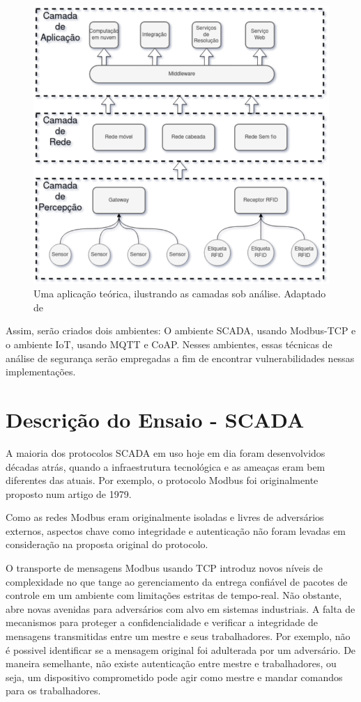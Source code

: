 \documentclass[tcc,capa]{texufpel}
\begin{document}
\begin{figure}[h]
    \centering
    \includegraphics[scale=0.6]{camadas.png}
    \caption{Uma aplicação teórica, ilustrando as camadas sob análise. Adaptado de \cite{schiller}}
    \label{fig:layers}
\end{figure}

Assim, serão criados dois ambientes: O ambiente SCADA, usando Modbus-TCP e o ambiente IoT, usando MQTT e CoAP. Nesses ambientes, essas técnicas de
análise de segurança serão empregadas a fim de encontrar vulnerabilidades nessas implementações.

\section{Descrição do Ensaio - SCADA}

A maioria dos protocolos SCADA em uso hoje em dia foram desenvolvidos décadas atrás, quando a infraestrutura tecnológica e as ameaças eram bem diferentes das atuais. Por exemplo, o
protocolo Modbus foi originalmente proposto num artigo de 1979.

Como as redes Modbus eram originalmente isoladas e livres de adversários externos, aspectos chave como integridade e autenticação não foram levadas em consideração na proposta
original do protocolo.

O transporte de mensagens Modbus usando TCP introduz novos níveis de complexidade no que tange ao gerenciamento da entrega confiável de pacotes de controle em um ambiente com
limitações estritas de tempo-real. Não obstante, abre novas avenidas para adversários com alvo em sistemas industriais.
A falta de mecanismos para proteger a confidencialidade e verificar a integridade de mensagens transmitidas entre um mestre e seus trabalhadores. Por exemplo, não é possivel
identificar se a mensagem original foi adulterada por um adversário. De maneira semelhante, não existe autenticação entre mestre e trabalhadores, ou seja, um dispositivo
comprometido pode agir como mestre e mandar comandos para os trabalhadores. 
\end{document}
